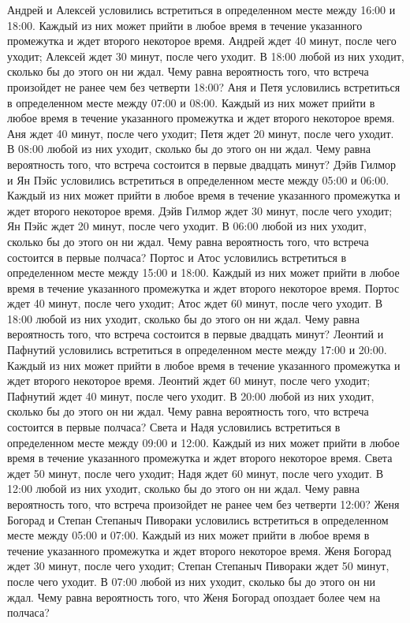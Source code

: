 Андрей и Алексей условились встретиться в определенном месте между 16:00 и 18:00. Каждый из них может прийти в любое время в течение указанного промежутка и ждет второго некоторое время. Андрей ждет 40 минут, после чего уходит; Алексей ждет 30 минут, после чего уходит. В 18:00 любой из них уходит, сколько бы до этого он ни ждал. Чему равна вероятность того, что встреча произойдет не ранее чем без четверти 18:00?
Аня и Петя условились встретиться в определенном месте между 07:00 и 08:00. Каждый из них может прийти в любое время в течение указанного промежутка и ждет второго некоторое время. Аня ждет 40 минут, после чего уходит; Петя ждет 20 минут, после чего уходит. В 08:00 любой из них уходит, сколько бы до этого он ни ждал. Чему равна вероятность того, что встреча состоится в первые двадцать минут?
Дэйв Гилмор и Ян Пэйс условились встретиться в определенном месте между 05:00 и 06:00. Каждый из них может прийти в любое время в течение указанного промежутка и ждет второго некоторое время. Дэйв Гилмор ждет 30 минут, после чего уходит; Ян Пэйс ждет 20 минут, после чего уходит. В 06:00 любой из них уходит, сколько бы до этого он ни ждал. Чему равна вероятность того, что встреча состоится в первые полчаса?
Портос и Атос условились встретиться в определенном месте между 15:00 и 18:00. Каждый из них может прийти в любое время в течение указанного промежутка и ждет второго некоторое время. Портос ждет 40 минут, после чего уходит; Атос ждет 60 минут, после чего уходит. В 18:00 любой из них уходит, сколько бы до этого он ни ждал. Чему равна вероятность того, что встреча состоится в первые двадцать минут?
Леонтий и Пафнутий условились встретиться в определенном месте между 17:00 и 20:00. Каждый из них может прийти в любое время в течение указанного промежутка и ждет второго некоторое время. Леонтий ждет 60 минут, после чего уходит; Пафнутий ждет 40 минут, после чего уходит. В 20:00 любой из них уходит, сколько бы до этого он ни ждал. Чему равна вероятность того, что встреча состоится в первые полчаса?
Света и Надя условились встретиться в определенном месте между 09:00 и 12:00. Каждый из них может прийти в любое время в течение указанного промежутка и ждет второго некоторое время. Света ждет 50 минут, после чего уходит; Надя ждет 60 минут, после чего уходит. В 12:00 любой из них уходит, сколько бы до этого он ни ждал. Чему равна вероятность того, что встреча произойдет не ранее чем без четверти 12:00?
Женя Богорад и Степан Степаныч Пивораки условились встретиться в определенном месте между 05:00 и 07:00. Каждый из них может прийти в любое время в течение указанного промежутка и ждет второго некоторое время. Женя Богорад ждет 30 минут, после чего уходит; Степан Степаныч Пивораки ждет 50 минут, после чего уходит. В 07:00 любой из них уходит, сколько бы до этого он ни ждал. Чему равна вероятность того, что Женя Богорад опоздает более чем на полчаса?
